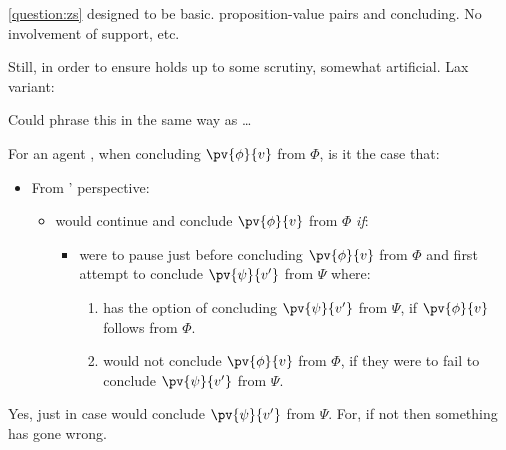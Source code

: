 \begin{note}
  \autoref{question:zs} designed to be basic.
  proposition-value pairs and concluding.
  No involvement of support, etc.

  Still, in order to ensure holds up to some scrutiny, somewhat artificial.
  Lax variant:

  {
    \color{red}
    Could phrase this in the same way as \dots
  }
  \begin{question}
    For an agent \vAgent{}, when concluding \(\pv{\phi}{v}\) from \(\Phi\), is it the case that:
    \begin{itemize}
    \item
      From \vAgent{}' perspective:
      \begin{itemize}
      \item
        \vAgent{} would continue and conclude \(\pv{\phi}{v}\) from \(\Phi\) \emph{if}:
        \begin{itemize}
        \item
          \vAgent{} were to pause just before concluding \(\pv{\phi}{v}\) from \(\Phi\) and first attempt to conclude \(\pv{\psi}{v'}\) from \(\Psi\) where:
          \begin{enumerate}[label=\alph*., ref=(\alph*)]
          \item
            \vAgent{} has the option of concluding \(\pv{\psi}{v'}\) from \(\Psi\), if \(\pv{\phi}{v}\) follows from \(\Phi\).
          \item
            \vAgent{} would not conclude \(\pv{\phi}{v}\) from \(\Phi\), if they were to fail to conclude \(\pv{\psi}{v'}\) from \(\Psi\).
          \end{enumerate}
        \end{itemize}
      \end{itemize}
    \end{itemize}
  \end{question}
  Yes, just in case would conclude \(\pv{\psi}{v'}\) from \(\Psi\).
  For, if not then something has gone wrong.
\end{note}


